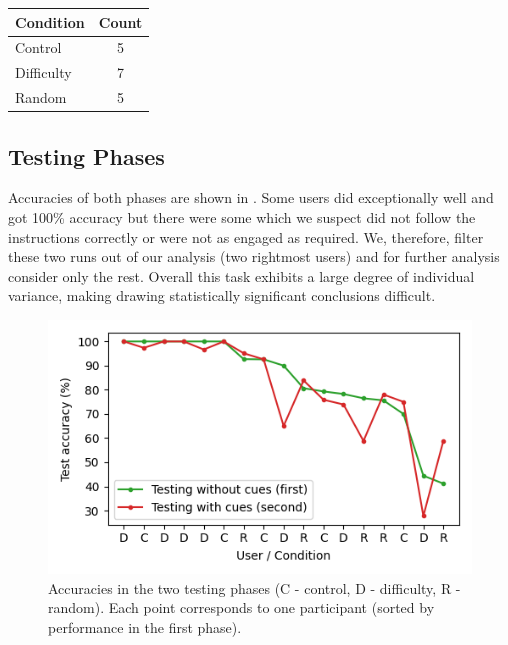 \begin{table}[ht]
\centering
\begin{tabular}{lc}
\toprule
Condition & Count \\
\midrule
Control & 5 \\
Difficulty & 7 \\
Random & 5 \\
\bottomrule
\end{tabular}
\end{table}

\vspace{-0.2cm}

\subsection{Testing Phases}

Accuracies of both phases are shown in .
Some users did exceptionally well and got 100\% accuracy but there were some which we suspect did not follow the instructions correctly or were not as engaged as required.
We, therefore, filter these two runs out of our analysis (two rightmost users) and for further analysis consider only the rest.
Overall this task exhibits a large degree of individual variance, making drawing statistically significant conclusions difficult.

\begin{figure}[ht]
\includegraphics[width=\linewidth]{img/individual_differences.png}
\caption{
    Accuracies in the two testing phases (C - control, D - difficulty, R - random).
    Each point corresponds to one participant (sorted by performance in the first phase).
}
\label{fig:individual_differences}
\end{figure}

